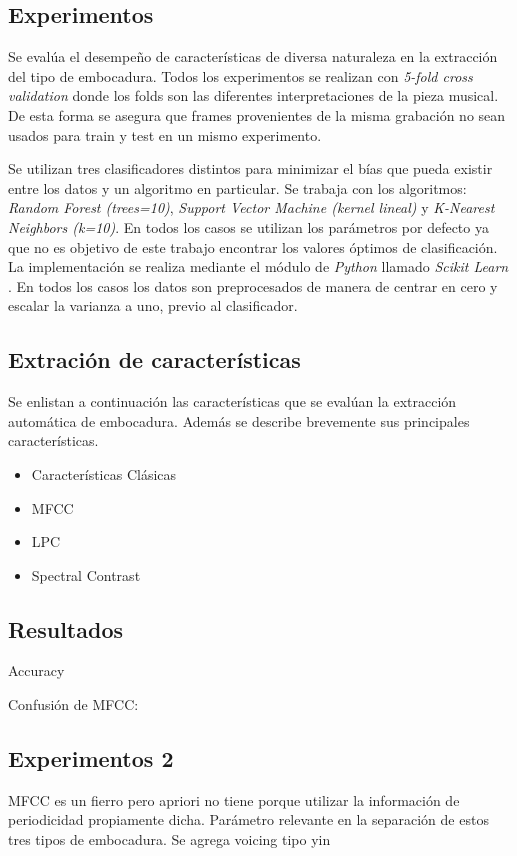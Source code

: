 \documentclass{article}
\begin{document}
   
\subsection{Experimentos}

Se evalúa el desempeño de características de diversa naturaleza en la extracción del tipo de embocadura. Todos los experimentos se realizan con \textit{5-fold cross validation} donde los folds son las diferentes interpretaciones de la pieza musical. De esta forma se asegura que frames provenientes de la misma grabación no sean usados para train y test en un mismo experimento.
\medskip

Se utilizan tres clasificadores distintos para minimizar el bías que pueda existir entre los datos y un algoritmo en particular. Se trabaja con los algoritmos: \textit{Random Forest (trees=10)}, \textit{Support Vector Machine (kernel lineal)} y \textit{K-Nearest Neighbors (k=10)}. En todos los casos se utilizan los parámetros por defecto ya que no es objetivo de este trabajo encontrar los valores óptimos de clasificación. La implementación se realiza mediante el módulo de \textit{Python} llamado \textit{Scikit Learn} \citep{pedregosa2011scikit}. En todos los casos los datos son preprocesados de manera de centrar en cero y escalar la varianza a uno, previo al clasificador.
\medskip

\subsection{Extración de características}
Se enlistan a continuación las características que se evalúan la extracción automática de embocadura. Además se describe brevemente sus principales características.

\begin{itemize} 
  \item Características Clásicas
  \item MFCC 
  \item LPC
  \item Spectral Contrast \citep{jiang2002music}
\end{itemize}

\subsection{Resultados}
Accuracy

Confusión de MFCC:

\subsection{Experimentos 2}
MFCC es un fierro pero apriori no tiene porque utilizar la información de periodicidad propiamente dicha. Parámetro relevante en la separación de estos tres tipos de embocadura. Se agrega voicing tipo yin \cite{de2002yin}
\end{document}
